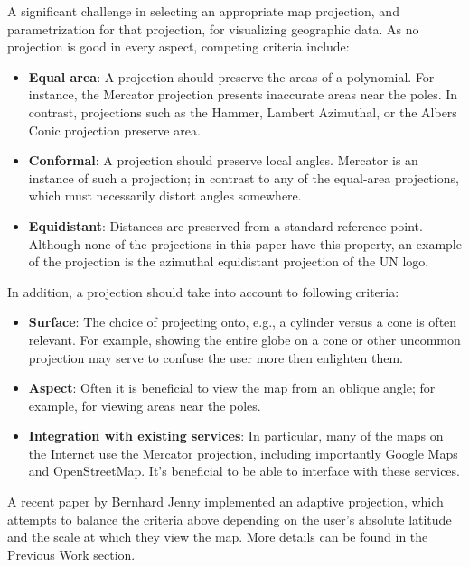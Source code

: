 A significant challenge in selecting an appropriate map projection, and
  parametrization for that projection, for visualizing geographic data.
As no projection is good in every aspect, competing criteria include:

\begin{itemize}
  \item \textbf{Equal area}: A projection should preserve the areas of a
        polynomial. For instance, the Mercator projection presents inaccurate
        areas near the poles. In contrast, projections such as the Hammer,
        Lambert Azimuthal, or the Albers Conic projection preserve area.
  \item \textbf{Conformal}: A projection should preserve local angles.
        Mercator is an instance of such a projection; in contrast to any of the
        equal-area projections, which must necessarily distort angles somewhere.
  \item \textbf{Equidistant}:  Distances are preserved from a standard
        reference point. Although none of the projections in this paper have
        this property, an example of the projection is the azimuthal
        equidistant projection of the UN logo.
\end{itemize}

In addition, a projection should take into account to following criteria:

\begin{itemize}
  \item \textbf{Surface}: The choice of projecting onto, e.g., a cylinder versus
        a cone is often relevant. For example, showing the entire globe on a
        cone or other uncommon projection may serve to confuse the user more
        then enlighten them.
  \item \textbf{Aspect}: Often it is beneficial to view the map from an oblique
        angle; for example, for viewing areas near the poles.
  \item \textbf{Integration with existing services}: In particular, many of the
        maps on the Internet use the Mercator projection, including importantly
        Google Maps and OpenStreetMap. It's beneficial to be able to interface
        with these services.
\end{itemize}

A recent paper by Bernhard Jenny \cite{key:2012jenny-maps} implemented an
  adaptive projection, which attempts to balance the criteria above
  depending on the user's absolute latitude and the scale at which they
  view the map.
More details can be found in the Previous Work section.

